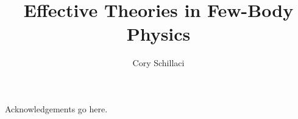 \documentclass{ucbthesis}
\begin{document}

\title{Effective Theories in Few-Body Physics}
\author{Cory Schillaci}


\maketitle
\approvalpage
\copyrightpage



\begin{frontmatter}



\tableofcontents
\clearpage
\listoffigures
\listoftables

\begin{acknowledgements}
Acknowledgements go here.

\end{acknowledgements}

\end{frontmatter}

\pagestyle{headings}










\appendix





\printbibliography
\end{document}
